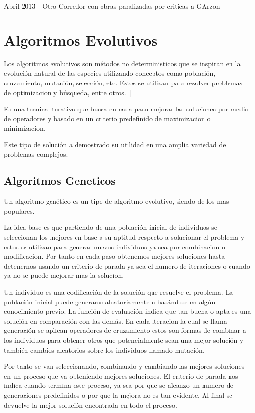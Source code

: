 Abril 2013 - Otro Corredor con obras paralizadas por criticas a GArzon





\section{Algoritmos Evolutivos}
Los algoritmos evolutivos son métodos no deterministicos que se inspiran en la evolución natural de las especies utilizando conceptos como población, cruzamiento, mutación, selección, etc. Estos se utilizan para resolver problemas de optimizacion y búsqueda, entre otros. []

Es una tecnica iterativa que busca en cada paso mejorar las soluciones por medio de operadores y basado en un criterio predefinido de maximizacion o minimizacion.

Este tipo de solución a demostrado su utilidad en una amplia variedad de problemas complejos.


\subsection{Algoritmos Geneticos}
Un algoritmo genético es un tipo de algoritmo evolutivo, siendo de los mas populares.

La idea base es que partiendo de una población inicial de individuos se seleccionan los mejores en base a su aptitud respecto a solucionar el problema y estos se utilizan para generar nuevos individuos ya sea por combinacion o modificacion. Por tanto en cada paso obtenemos mejores soluciones hasta detenernos usando un criterio de parada ya sea el numero de iteraciones o cuando ya no se puede mejorar mas la solucion.

Un individuo es una codificación de la solución que resuelve el problema.
La población inicial puede generarse aleatoriamente o basándose en algún conocimiento previo.
La función de evaluación indica que tan buena o apta es una solución en comparación con las demás.
En cada iteracion la cual se llama generación se aplican operadores de cruzamiento estos son formas de combinar a los individuos para obtener otros que potencialmente sean una mejor solución y también cambios aleatorios sobre los individuos llamado mutación.

Por tanto se van seleccionando, combinando y cambiando las mejores soluciones en un proceso que va obteniendo mejores soluciones.
El criterio de parada nos indica cuando termina este proceso, ya sea por que se alcanzo un numero de generaciones predefinidos o por que la mejora no es tan evidente. Al final se devuelve la mejor solución encontrada en todo el proceso.


